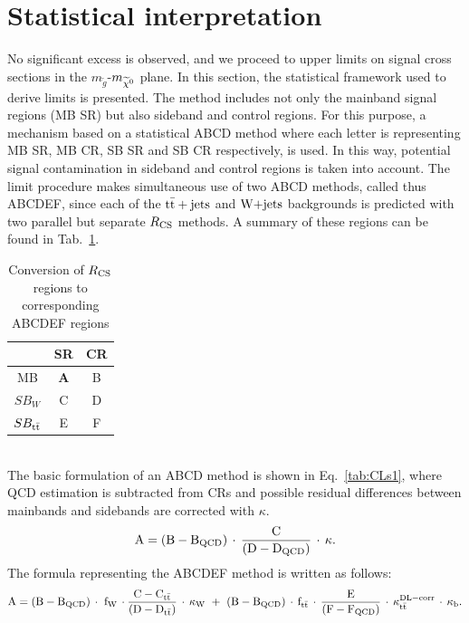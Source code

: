 \section{Statistical interpretation}
\label{LimitProc}
No significant excess is observed, and we proceed to upper limits on signal cross sections in the $m_{\tilde{g}}$-$m_{\widetilde{\chi}^0}$ plane. In this section, the statistical framework used to derive limits is presented. The method includes not only the mainband signal regions (MB SR) but also sideband and control regions. For this purpose, a mechanism based on a statistical ABCD method where each letter is representing MB SR, MB CR, SB SR and SB CR respectively, is used. In this way, potential signal contamination in sideband and control regions is taken into account.
The limit procedure makes simultaneous use of two ABCD methods, called thus ABCDEF, since each of the ${\rm t\bar{t}+jets}$ and $\textrm{W+jets}$ backgrounds is predicted with two parallel but separate $R_{\rm CS}$ methods. A summary of these regions can be found in Tab.~\ref{tab:RCStoABCD}.
 \renewcommand{\arraystretch}{1.5}
\begin{table}[!htb]
\caption{Conversion of $R_{\rm CS}$ regions to corresponding ABCDEF regions}
\label{tab:RCStoABCD}
\centering
\begin{tabular}{c|c|c}
                             & SR   & CR \\ \hline
MB & {\bf A} & B \\ \hline
$SB_{W}$      & C & D \\ \hline
 $SB_{\rm t\bar{t}}$    & E & F \\
\end{tabular}
\end{table}
\renewcommand{\arraystretch}{1.0}\\
The basic formulation of an ABCD method is shown in Eq.~\ref{tab:CLs1}, where QCD estimation is subtracted from CRs and possible residual differences between mainbands and sidebands are corrected with $\kappa$.
\begin{equation}
\label{tab:CLs1}
{\rm A}={\rm (B-B_{QCD})\,\cdot\,\frac{C}{(D-D_{QCD})}\,\cdot\,\kappa}.
\end{equation}
The formula representing the ABCDEF method is written as follows:
\begin{equation}
\label{tab:CLs2}
{\rm A}={\rm (B-B_{QCD})\,\cdot\,\,f_W\,\cdot\frac{C-C_{\rm t\bar{t}}}{(D-D_{\rm t\bar{t}})}\,\cdot\,\kappa_W\,\,+\,\, \rm (B-B_{QCD})\,\cdot\,f_{\rm t\bar{t}}\,\cdot\, \frac{E}{(F-F_{QCD})}\,\cdot\,\kappa_{\rm t\bar{t}}^{DL-corr}\,\cdot\, \kappa_{b} }.
\end{equation}
